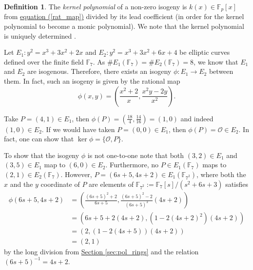 \documentclass[openany, a4paper, 10pt]{book}
\theoremstyle{plain}
\theoremstyle{plain}
\theoremstyle{plain}
\theoremstyle{definition}
\newtheorem{definition}[theorem]{Definition}
\theoremstyle{plain}
\theoremstyle{definition}
\theoremstyle{remark}
\renewcommand{\eqref}[1]{\hyperref[#1]{equation (\ref{#1})}}
\newcommand{\secref}[1]{\hyperref[#1]{Section \ref{#1}}}
\begin{document}
\begin{definition}
    The \textit{kernel polynomial} of a non-zero isogeny is $k(x) \in \mathbb F_p[x]$ from \eqref{rat_map} divided by its lead coefficient (in order for the kernel polynomial to become a monic polynomial).
    We note that the kernel polynomial is uniquely determined \cite[p.~9]{rational_maps}.
\end{definition}


\begin{examplebox}
    Let $E_1: y^2 = x^3 + 3x^2 + 2x$ and $E_2: y^2 = x^3 + 3 x^2 + 6x+4$ be elliptic curves defined over the finite field $\mathbb F_7$.
    As $\#E_1(\mathbb F_7) = \#E_2(\mathbb F_7)=8$, we know that $E_1$ and $E_2$ are isogenous.
    Therefore, there exists an isogeny $\phi: E_1 \to E_2$ between them.
    In fact, such an isogeny is given by the rational map
    \begin{equation*}
        \phi(x, y) = \left( \frac{x^2+2}{x}, \frac{x^2y - 2y}{x^2} \right).
    \end{equation*}

    Take $P=(4,1) \in E_1$, then $\phi(P) = \left(\frac{18}{4}, \frac{14}{16} \right) = (1, 0)$ and indeed $(1, 0) \in E_2$.
    If we would have taken $P=(0,0) \in E_1$, then $\phi(P) = \mathcal O\in E_2$.
    In fact, one can show that $\ker \phi = \{ \mathcal O, P \}$.

    To show that the isogeny $\phi$ is not one-to-one note that
    both $(3,2)\in E_1$ and $(3,5)\in E_1$ map to $(6,0) \in E_2$.
    Furthermore, no $P \in E_1(\mathbb F_7)$ maps to $(2,1) \in E_2(\mathbb F_7)$.
    However, $P = (6s+5, 4s+2) \in E_1(\mathbb F_{7^2})$, where both the $x$ and the $y$ coordinate of $P$ are elements of $\mathbb F_{7^2} := \mathbb F_7[s]/(s^2+6s+3)$ satisfies
    \begin{align*}
        \phi(6s+5, 4s+2) &= \left( \frac{(6s+5)^2 + 2}{6s+5}, \frac{(6s+5)^2 - 2}{(6s+5)^2} (4s+2) \right) \\
                         &= \left( 6s+5 + 2(4s+2), (1 - 2 (4s+2)^2) (4s+2) \right) \\
                         &= \left( 2, (1 - 2 (4s+5)) (4s+2) \right) \\
                         &= \left( 2, 1 \right)
    \end{align*}
    by the long division from \secref{sec:pol_rings} and the relation $(6s+5)^{-1} = 4s+2$.
\end{examplebox}
\end{document}
